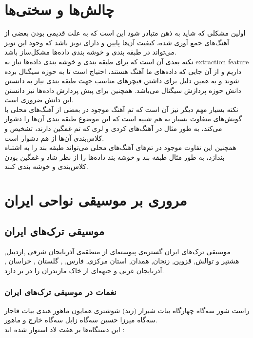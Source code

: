 \section{چالش‌ها و سختی‌ها}
اولین مشکلی که شاید به ذهن متبادر شود این است که به علت قدیمی بودن بعضی از آهنگ‌های جمع آوری شده، کیفیت آن‌ها پایین و دارای
نویز باشد که وجود این نویز می‌تواند در طبقه بندی و خوشه بندی داده‌ها مشکل‌ساز باشد. \\
نکته بعدی آن است که برای طبقه بندی و خوشه بندی داده‌ها نیاز به
extraction feature
داریم و از آن جایی 
که داده‌های ما آهنگ هستند، احتیاج است تا به حوزه سیگنال برده شوند و به همین دلیل برای داشتن فیچرهای مناسب جهت طبقه بندی 
نیاز به دانستن دانش حوزه پردازش سیگنال می‌باشد. همچنین برای پیش پردازش داده‌ها نیز دانستن این دانش ضروری است. \\
نکته بسیار مهم دیگر نیز آن است که تم آهنگ موجود در بعضی از آهنگ‌های محلی با گویش‌های متفاوت بسیار به هم شبیه است که 
این موضوع طبقه بندی آن‌ها را دشوار می‌کند، به طور مثال در آهنگ‌های کردی و لری که تم غمگین دارند، تشخیص و کلاس‌بندی آن‌ها
از هم دشوار است. \\
همچنین این تفاوت موجود در تم‌های آهنگ‌های محلی می‌تواند طبقه بند را به اشتباه بندازد، به طور مثال طبقه بند و خوشه بند داده‌ها را از نظر شاد و 
غمگین بودن کلاس‌بندی و خوشه بندی کنند. \\

\section{مروری بر موسیقی نواحی ایران}

\subsection{موسیقی ترک‌های ایران}
    موسیقی ترک‌های ایران گستره‌ی پیوسته‌ای از منطقه‌ی آذربایجان شرقی ,اردبیل, هشتپر و توالش, قزوین, زنجان, همدان, استان مرکزی, فارس, , گلستان , خراسان , آذربایجان غربی و جبهه‌ای از خاک مازندران را در بر دارد.
    \subsubsection{نغمات در موسیقی ترک‌های ایران}
        راست شور سه‌گاه چهارگاه بیات شیراز (زند) شوشتری همایون  ماهور هندی بیات قاجار سه‌گاه میرزا حسین  سه‌گاه زابل  سه‌گاه خارج و ماهور.\\
        
        این دستگاه‌ها بر هفت لاد استوار شده اند :\\
        
